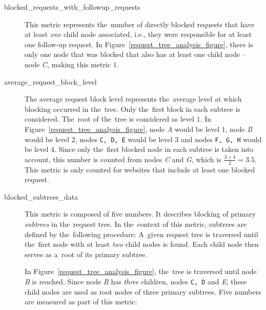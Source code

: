 \begin{description}

\item[blocked\_requests\_with\_followup\_requests]
This metric represents the~number of directly blocked requests that have at least \emph{one} child node associated, i.e., they were responsible for at least one follow-up request. In Figure~\ref{request_tree_analysis_figure}, there is only one node that was blocked that also has at least one child node -- node \emph{C}, making this metric $1$.

\item[average\_request\_block\_level]
The average request block level represents the~average level at which blocking occurred in the~tree. Only the~first block in each subtree is considered. The~root of the~tree is considered as level $1$. In Figure~\ref{request_tree_analysis_figure}, node \emph{A} would be level $1$, node \emph{B} would be level $2$, nodes \texttt{C, D, E} would be level $3$ and nodes \texttt{F, G, H} would be level $4$. Since only the~first blocked node in each subtree is taken into account, this number is counted from nodes \emph{C} and \emph{G}, which is $\frac{3 + 4}{2} = 3.5$. This metric is only counted for websites that include at least one blocked request.

\item[blocked\_subtrees\_data]
This metric is composed of five numbers. It describes blocking of primary \textit{subtrees} in the~request tree. In the~context of this metric, subtrees are defined by the~following procedure: A~given request tree is traversed until the~first node with at least \textit{two} child nodes is found. Each child node then serves as a~root of its primary subtree.

In Figure~\ref{request_tree_analysis_figure}, the~tree is traversed until node \emph{B} is reached. Since node \emph{B} has \textit{three} children, nodes \texttt{C, D} and \emph{E}, these child nodes are used as root nodes of three primary subtrees. Five numbers are measured as part of this metric:

\end{description}

